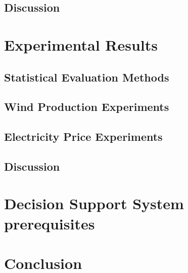 \documentclass[twoside,11pt,openright]{report}
\begin{document}
\section{Discussion}



\chapter{Experimental Results}
\label{ch:experimentalResults}
\section{Statistical Evaluation Methods}
\label{sec:statisticalEvaluation}

\section{Wind Production Experiments}
\label{sec:windProductionExperiments}

\section{Electricity Price Experiments}
\label{sec:priceExperiments}

\section{Discussion}



\chapter{Decision Support System prerequisites}
\label{ch:dss}



\chapter{Conclusion}
\label{ch:conclusion}

\todo{\dots}



 

\end{document}
